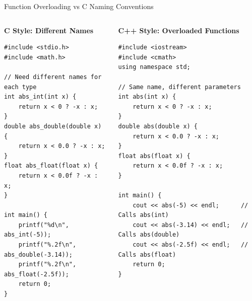 \begin{frame}[fragile]{Function Overloading vs C Naming Conventions}
    \begin{columns}
        \begin{column}{0.5\textwidth}
            \textbf{C Style: Different Names}
            \begin{verbatim}
#include <stdio.h>
#include <math.h>

// Need different names for each type
int abs_int(int x) {
    return x < 0 ? -x : x;
}
double abs_double(double x) {
    return x < 0.0 ? -x : x;
}
float abs_float(float x) {
    return x < 0.0f ? -x : x;
}

int main() {
    printf("%d\n", abs_int(-5));
    printf("%.2f\n", abs_double(-3.14));
    printf("%.2f\n", abs_float(-2.5f));
    return 0;
}
            \end{verbatim}
        \end{column}
        \begin{column}{0.5\textwidth}
            \textbf{C++ Style: Overloaded Functions}
            \begin{verbatim}
#include <iostream>
#include <cmath>
using namespace std;

// Same name, different parameters
int abs(int x) {
    return x < 0 ? -x : x;
}
double abs(double x) {
    return x < 0.0 ? -x : x;
}
float abs(float x) {
    return x < 0.0f ? -x : x;
}

int main() {
    cout << abs(-5) << endl;      // Calls abs(int)
    cout << abs(-3.14) << endl;   // Calls abs(double)
    cout << abs(-2.5f) << endl;   // Calls abs(float)
    return 0;
}
            \end{verbatim}
        \end{column}
    \end{columns}
\end{frame}

